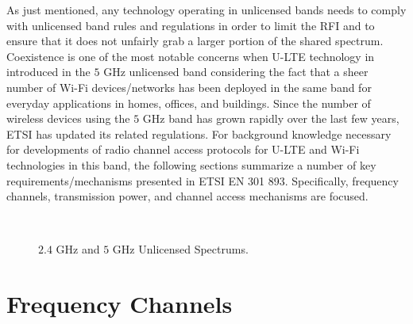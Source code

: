 As just mentioned, any technology operating in unlicensed bands needs to comply with unlicensed band rules and regulations in order to limit the RFI and to ensure that it does not unfairly grab a larger portion of the shared spectrum.  Coexistence is one of the most notable concerns when U-LTE technology in introduced in the $5$ GHz unlicensed band considering the fact that a sheer number of Wi-Fi devices/networks has been deployed in the same band for everyday applications in homes, offices, and buildings. Since the number of wireless devices using the $5$ GHz band has grown rapidly over the last few years, ETSI has updated its related regulations. For background knowledge necessary for developments of radio channel access protocols for U-LTE and Wi-Fi technologies in this band, the following sections summarize a number of key requirements/mechanisms presented in ETSI EN 301 893. Specifically, frequency channels, transmission power, and channel access mechanisms are focused.

\begin{figure}[!ht] 	
	\\
	\caption{$2.4$ GHz and $5$ GHz Unlicensed Spectrums.}
		\label{figs:2-5GHz-spectrum}
\end{figure}



\section{Frequency Channels}

